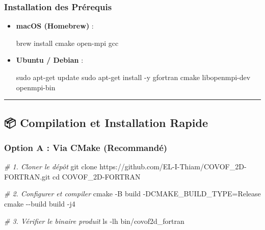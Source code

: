 \documentclass[
  french,
]{article}
\newenvironment{Shaded}{}{}
\newcommand{\AttributeTok}[1]{\textcolor[rgb]{0.49,0.56,0.16}{#1}}
\newcommand{\BuiltInTok}[1]{\textcolor[rgb]{0.00,0.50,0.00}{#1}}
\newcommand{\CommentTok}[1]{\textcolor[rgb]{0.38,0.63,0.69}{\textit{#1}}}
\newcommand{\ExtensionTok}[1]{#1}
\newcommand{\FunctionTok}[1]{\textcolor[rgb]{0.02,0.16,0.49}{#1}}
\newcommand{\NormalTok}[1]{#1}
\newcommand{\OperatorTok}[1]{\textcolor[rgb]{0.40,0.40,0.40}{#1}}
\begin{document}
\subsubsection{Installation des
Prérequis}\label{installation-des-pruxe9requis}

\begin{itemize}
\item
  \textbf{macOS (Homebrew)} :

\begin{Shaded}
\begin{Highlighting}[]
\ExtensionTok{brew}\NormalTok{ install cmake open{-}mpi gcc}
\end{Highlighting}
\end{Shaded}
\item
  \textbf{Ubuntu / Debian} :

\begin{Shaded}
\begin{Highlighting}[]
\FunctionTok{sudo}\NormalTok{ apt{-}get update}
\FunctionTok{sudo}\NormalTok{ apt{-}get install }\AttributeTok{{-}y}\NormalTok{ gfortran cmake libopenmpi{-}dev openmpi{-}bin}
\end{Highlighting}
\end{Shaded}
\end{itemize}

\begin{center}\rule{0.5\linewidth}{0.5pt}\end{center}

\subsection{📦 Compilation et Installation
Rapide}\label{compilation-et-installation-rapide}

\subsubsection{Option A : Via CMake
(Recommandé)}\label{option-a-via-cmake-recommanduxe9}

\begin{Shaded}
\begin{Highlighting}[]
\CommentTok{\# 1. Cloner le dépôt}
\FunctionTok{git}\NormalTok{ clone https://github.com/EL{-}I{-}Thiam/COVOF\_2D{-}FORTRAN.git}
\BuiltInTok{cd}\NormalTok{ COVOF\_2D{-}FORTRAN}

\CommentTok{\# 2. Configurer et compiler}
\FunctionTok{cmake} \AttributeTok{{-}B}\NormalTok{ build }\AttributeTok{{-}DCMAKE\_BUILD\_TYPE}\OperatorTok{=}\NormalTok{Release}
\FunctionTok{cmake} \AttributeTok{{-}{-}build}\NormalTok{ build }\AttributeTok{{-}j4}

\CommentTok{\# 3. Vérifier le binaire produit}
\FunctionTok{ls} \AttributeTok{{-}lh}\NormalTok{ bin/covof2d\_fortran}
\end{Highlighting}
\end{Shaded}
\end{document}
